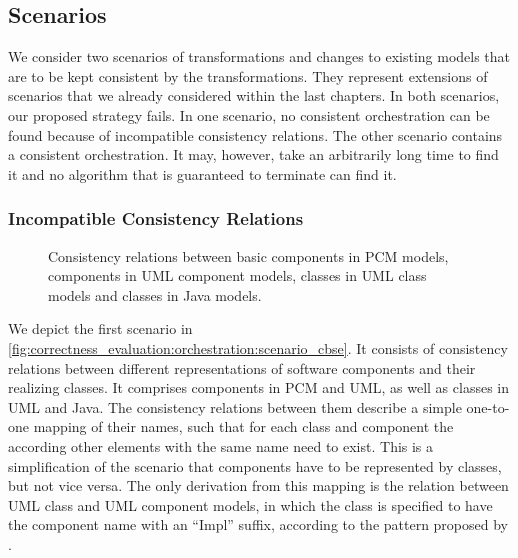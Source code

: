 \subsection{Scenarios}

We consider two scenarios of transformations and changes to existing models that are to be kept consistent by the transformations.
They represent extensions of scenarios that we already considered within the last chapters.
In both scenarios, our proposed strategy fails.
In one scenario, no consistent orchestration can be found because of incompatible consistency relations.
The other scenario contains a consistent orchestration. It may, however, take an arbitrarily long time to find it and no algorithm that is guaranteed to terminate can find it.


\subsubsection*{Incompatible Consistency Relations}

\begin{figure}
    \centering
    
    \caption[Example scenario with incompatibility]{Consistency relations between basic components in \gls{PCM} models, components in \gls{UML} component models, classes in \gls{UML} class models and classes in Java models.}
    \label{fig:correctness_evaluation:orchestration:scenario_cbse}
\end{figure}

We depict the first scenario in \autoref{fig:correctness_evaluation:orchestration:scenario_cbse}.
It consists of consistency relations between different representations of software components and their realizing classes.
It comprises components in \gls{PCM} and \gls{UML}, as well as classes in \gls{UML} and Java.
The consistency relations between them describe a simple one-to-one mapping of their names, such that for each class and component the according other elements with the same name need to exist.
This is a simplification of the scenario that components have to be represented by classes, but not vice versa.
The only derivation from this mapping is the relation between \gls{UML} class and \gls{UML} component models, in which the class is specified to have the component name with an \enquote{Impl} suffix, according to the pattern proposed by \textcite{langhammer2017a}.

